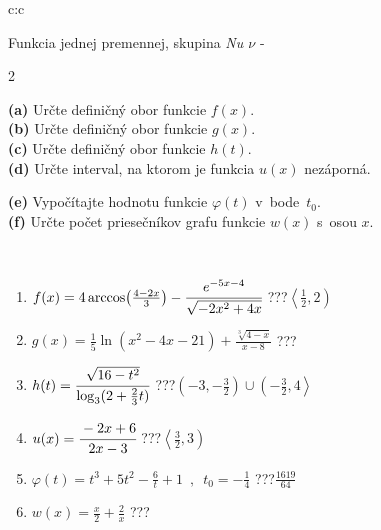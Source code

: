 \documentclass[10pt]{report}
\begin{document}
\begin{tabular}{c:c}
\begin{minipage}[c][104.5mm][t]{0.5\linewidth}
\begin{center}
{\huge Funkcia jednej premennej, skupina \textit{Nu $\nu$} -}\\[5mm]
\begin{minipage}{0.95\linewidth}
\begin{center}
{\small \begin{multicols}{2} \raggedright
\textbf{(a)} Určte definičný obor funkcie \(f(x)\). \\[1mm]
\textbf{(b)} Určte definičný obor funkcie \(g(x)\). \\[1mm]
\textbf{(c)} Určte definičný obor funkcie \(h(t)\). \\[1mm]
\textbf{(d)} Určte interval, na ktorom je funkcia \(u(x)\) nezáporná. \par \columnbreak
\textbf{(e)} Vypočítajte hodnotu funkcie \(\varphi(t)\) v~bode~\(t_0\). \\[1mm]
\textbf{(f)} Určte počet priesečníkov grafu funkcie \(w(x)\) s~osou \(x\). \\[1mm]
\end{multicols}
}
\end{center}
\end{minipage}
\\[4mm]
\begin{minipage}{0.79\linewidth}
\begin{center}
\begin{varwidth}{\linewidth}
\begin{enumerate}
\small
\item $f(x) = 4\arccos\!\left( \frac{4-2x}{3} \right) - \cfrac{e^{-5x-4}}{\sqrt{-2x^2+4x}}$\quad \dotfill\; ???\;\dotfill \quad $\left\langle\frac{1}{2} , 2\right)$
\item $g(x) = \frac{1}{5} \ln{\!(x^2-4x-21)}+\frac{\sqrt[3]{4-x}}{x-8}$\quad \dotfill\; ???\;\dotfill {}
\item $h(t) = \cfrac{\sqrt{16-t^2}}{\log_3(2+\frac{2}{3}t)}$\quad \dotfill\; ???\;\dotfill \quad $\left(-3 , -\frac{3}{2}\right)\cup\left(-\frac{3}{2} , 4\right\rangle$
\item $u(x) = \cfrac{-2x+6}{2x-3}$\quad \dotfill\; ???\;\dotfill \quad $\left\langle\frac{3}{2} , 3\right)$
\item $\varphi(t) = t^3+5t^2-\frac{6}{t}+1 \enspace , \enspace t_0=-\frac{1}{4}$\quad \dotfill\; ???\;\dotfill \quad $\frac{1619}{64}$
\item $w(x) = \frac{x}{2}+\frac{2}{x}$\quad \dotfill\; ???\;\dotfill {}
\end{enumerate}

\end{varwidth}
\end{center}
\end{minipage}
\end{center}
\end{minipage}
\end{tabular}
\end{document}
